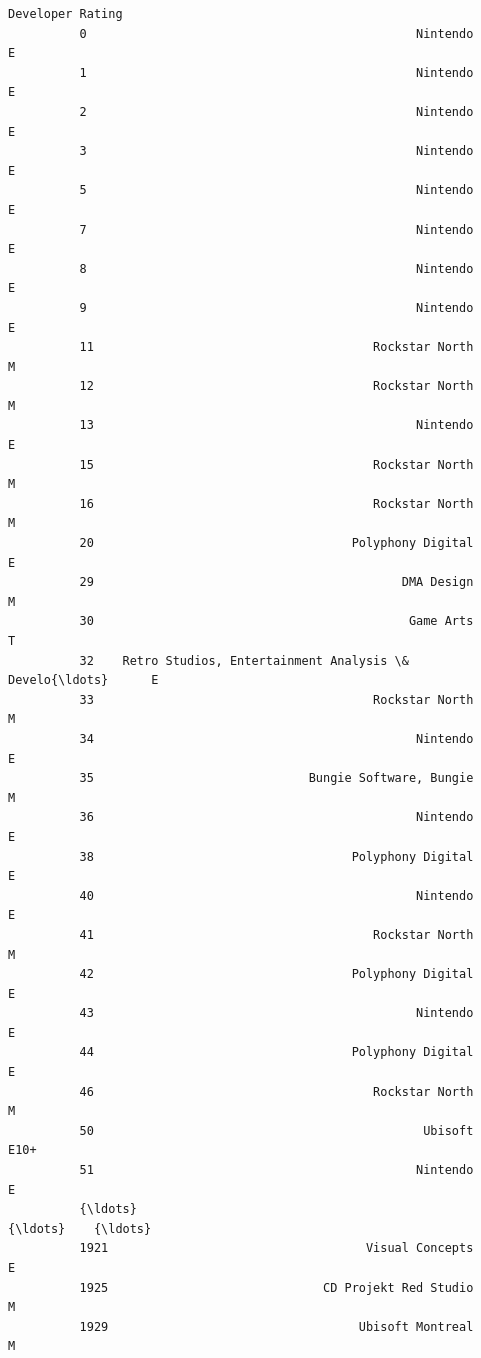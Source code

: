 \documentclass[11pt]{article}
\begin{document}
\begin{Verbatim}[commandchars=\\\{\}]
                                                        Developer Rating  
          0                                              Nintendo      E  
          1                                              Nintendo      E  
          2                                              Nintendo      E  
          3                                              Nintendo      E  
          5                                              Nintendo      E  
          7                                              Nintendo      E  
          8                                              Nintendo      E  
          9                                              Nintendo      E  
          11                                       Rockstar North      M  
          12                                       Rockstar North      M  
          13                                             Nintendo      E  
          15                                       Rockstar North      M  
          16                                       Rockstar North      M  
          20                                    Polyphony Digital      E  
          29                                           DMA Design      M  
          30                                            Game Arts      T  
          32    Retro Studios, Entertainment Analysis \& Develo{\ldots}      E  
          33                                       Rockstar North      M  
          34                                             Nintendo      E  
          35                              Bungie Software, Bungie      M  
          36                                             Nintendo      E  
          38                                    Polyphony Digital      E  
          40                                             Nintendo      E  
          41                                       Rockstar North      M  
          42                                    Polyphony Digital      E  
          43                                             Nintendo      E  
          44                                    Polyphony Digital      E  
          46                                       Rockstar North      M  
          50                                              Ubisoft   E10+  
          51                                             Nintendo      E  
          {\ldots}                                                 {\ldots}    {\ldots}  
          1921                                    Visual Concepts      E  
          1925                              CD Projekt Red Studio      M  
          1929                                   Ubisoft Montreal      M  

\end{Verbatim}
\end{document}

